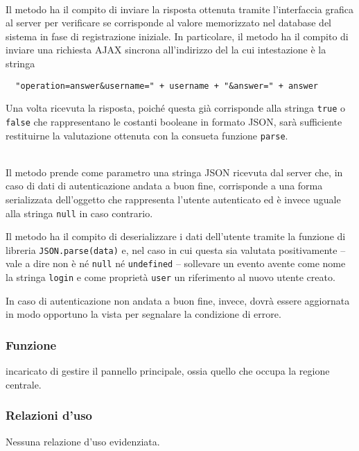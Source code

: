 \begin{description}
\item{}\\
Il metodo ha il compito di inviare la risposta ottenuta tramite l'interfaccia grafica al server per verificare se corrisponde al valore memorizzato nel database del sistema in fase di registrazione iniziale. In particolare, il metodo ha il compito di inviare una richiesta AJAX sincrona all'indirizzo del  la cui intestazione è la stringa
\begin{verbatim}
  "operation=answer&username=" + username + "&answer=" + answer
\end{verbatim}

Una volta ricevuta la risposta, poiché questa già corrisponde alla stringa \verb+true+ o \verb+false+ che rappresentano le costanti booleane in formato JSON, sarà sufficiente restituirne la valutazione ottenuta con la consueta funzione \verb+parse+.

\item{}\\
Il metodo prende come parametro una stringa JSON ricevuta dal server che, in caso di dati di autenticazione andata a buon fine, corrisponde a una forma serializzata dell'oggetto che rappresenta l'utente autenticato ed è invece uguale alla stringa \verb+null+ in caso contrario.

Il metodo ha il compito di deserializzare i dati dell'utente tramite la funzione di libreria \verb+JSON.parse(data)+ e, nel caso in cui questa sia valutata positivamente -- vale a dire non è né \verb+null+ né \verb+undefined+ -- sollevare un evento avente come nome la stringa \verb'login' e come proprietà \verb+user+ un riferimento al nuovo utente creato.

In caso di autenticazione non andata a buon fine, invece, dovrà essere aggiornata in modo opportuno la vista per segnalare la condizione di errore.

\end{description}



\subsubsection*{Funzione}
 incaricato di gestire il pannello principale, ossia quello che occupa la regione centrale.

\subsubsection*{Relazioni d'uso}
Nessuna relazione d'uso evidenziata.


